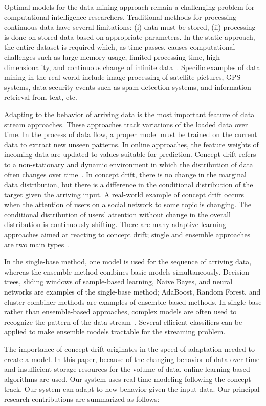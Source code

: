 \documentclass[12pt,a4paper]{article}
\begin{document}
	Optimal models for the data mining approach remain a challenging problem for computational intelligence researchers. Traditional methods for processing continuous data have several limitations: (i) data must be stored, (ii) processing is done on stored data based on appropriate parameters. In the static approach, the entire dataset is required which, as time passes, causes computational challenges such as large memory usage, limited processing time, high dimensionality, and continuous change of infinite data~\cite{Krawczyk2017}. Specific examples of data mining in the real world include image processing of satellite pictures, GPS systems, data security events such as spam detection systems, and information retrieval from text, etc.
	
	Adapting to the behavior of arriving data is the most important feature of data stream approaches. These approaches track variations of the loaded data over time. In the process of data flow, a proper model must be trained on the current data to extract new unseen patterns. In online approaches, the feature weights of incoming data are updated to values suitable for prediction. Concept drift refers to a non-stationary and dynamic environment in which the distribution of data often changes over time~\cite{Escovedo2018}. In concept drift, there is no change in the marginal data distribution, but there is a difference in the conditional distribution of the target given the arriving input. A real-world example of concept drift occurs when the attention of users on a social network to some topic is changing. The conditional distribution of users' attention without change in the overall distribution is continuously shifting. There are many adaptive learning approaches aimed at reacting to concept drift; single and ensemble approaches are two main types~\cite{Farid2013}.
	
	In the single-base method, one model is used for the sequence of arriving data, whereas the ensemble method combines basic models simultaneously. Decision trees, sliding windows of sample-based learning, Naive Bayes, and neural networks are examples of the single-base method; AdaBoost, Random Forest, and cluster combiner methods are examples of ensemble-based methods. In single-base rather than ensemble-based approaches, complex models are often used to recognize the pattern of the data stream~\cite{Babcock2002}. Several efficient classifiers can be applied to make ensemble models tractable for the streaming problem.
	
	The importance of concept drift originates in the speed of adaptation needed to create a model. In this paper, because of the changing behavior of data over time and insufficient storage resources for the volume of data, online learning-based algorithms are used. Our system uses real-time modeling following the concept track. Our system can adapt to new behavior given the input data. Our principal research contributions are summarized as follows:
	
\end{document}
